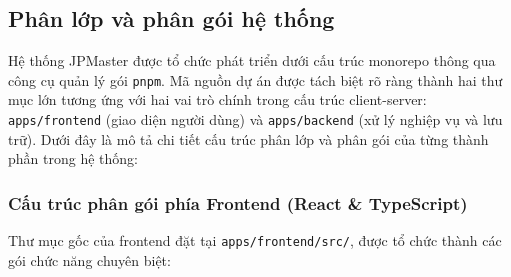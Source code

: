 \documentclass[../DoAn.tex]{subfiles}
\begin{document}
\subsection{Phân lớp và phân gói hệ thống}
Hệ thống JPMaster được tổ chức phát triển dưới cấu trúc monorepo thông qua công cụ quản lý gói \texttt{pnpm}. Mã nguồn dự án được tách biệt rõ ràng thành hai thư mục lớn tương ứng với hai vai trò chính trong cấu trúc client-server: \texttt{apps/frontend} (giao diện người dùng) và \texttt{apps/backend} (xử lý nghiệp vụ và lưu trữ). Dưới đây là mô tả chi tiết cấu trúc phân lớp và phân gói của từng thành phần trong hệ thống:

\subsubsection{Cấu trúc phân gói phía Frontend (React \& TypeScript)}
Thư mục gốc của frontend đặt tại \texttt{apps/frontend/src/}, được tổ chức thành các gói chức năng chuyên biệt:
\end{document}
